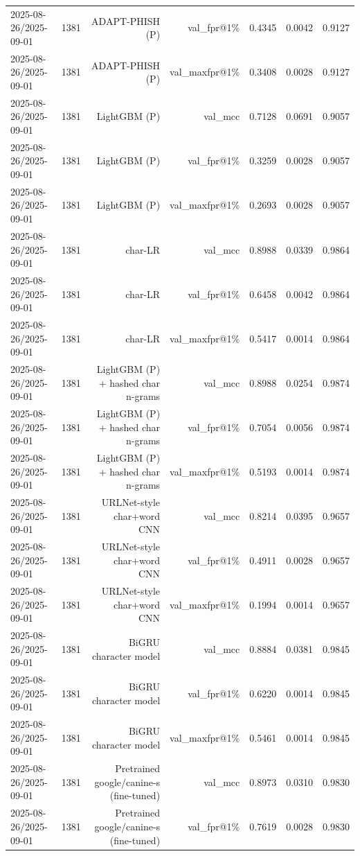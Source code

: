 \begin{table}[t]
\begin{tabular}{llrrrrr}
2025-08-26/2025-09-01 & 1381 & ADAPT-PHISH (P) & val\_fpr@1\% & 0.4345 & 0.0042 & 0.9127 \\
2025-08-26/2025-09-01 & 1381 & ADAPT-PHISH (P) & val\_maxfpr@1\% & 0.3408 & 0.0028 & 0.9127 \\
2025-08-26/2025-09-01 & 1381 & LightGBM (P) & val\_mcc & 0.7128 & 0.0691 & 0.9057 \\
2025-08-26/2025-09-01 & 1381 & LightGBM (P) & val\_fpr@1\% & 0.3259 & 0.0028 & 0.9057 \\
2025-08-26/2025-09-01 & 1381 & LightGBM (P) & val\_maxfpr@1\% & 0.2693 & 0.0028 & 0.9057 \\
2025-08-26/2025-09-01 & 1381 & char-LR & val\_mcc & 0.8988 & 0.0339 & 0.9864 \\
2025-08-26/2025-09-01 & 1381 & char-LR & val\_fpr@1\% & 0.6458 & 0.0042 & 0.9864 \\
2025-08-26/2025-09-01 & 1381 & char-LR & val\_maxfpr@1\% & 0.5417 & 0.0014 & 0.9864 \\
2025-08-26/2025-09-01 & 1381 & LightGBM (P) + hashed char n-grams & val\_mcc & 0.8988 & 0.0254 & 0.9874 \\
2025-08-26/2025-09-01 & 1381 & LightGBM (P) + hashed char n-grams & val\_fpr@1\% & 0.7054 & 0.0056 & 0.9874 \\
2025-08-26/2025-09-01 & 1381 & LightGBM (P) + hashed char n-grams & val\_maxfpr@1\% & 0.5193 & 0.0014 & 0.9874 \\
2025-08-26/2025-09-01 & 1381 & URLNet-style char+word CNN & val\_mcc & 0.8214 & 0.0395 & 0.9657 \\
2025-08-26/2025-09-01 & 1381 & URLNet-style char+word CNN & val\_fpr@1\% & 0.4911 & 0.0028 & 0.9657 \\
2025-08-26/2025-09-01 & 1381 & URLNet-style char+word CNN & val\_maxfpr@1\% & 0.1994 & 0.0014 & 0.9657 \\
2025-08-26/2025-09-01 & 1381 & BiGRU character model & val\_mcc & 0.8884 & 0.0381 & 0.9845 \\
2025-08-26/2025-09-01 & 1381 & BiGRU character model & val\_fpr@1\% & 0.6220 & 0.0014 & 0.9845 \\
2025-08-26/2025-09-01 & 1381 & BiGRU character model & val\_maxfpr@1\% & 0.5461 & 0.0014 & 0.9845 \\
2025-08-26/2025-09-01 & 1381 & Pretrained google/canine-s (fine-tuned) & val\_mcc & 0.8973 & 0.0310 & 0.9830 \\
2025-08-26/2025-09-01 & 1381 & Pretrained google/canine-s (fine-tuned) & val\_fpr@1\% & 0.7619 & 0.0028 & 0.9830 \\

\end{tabular}
\end{table}
